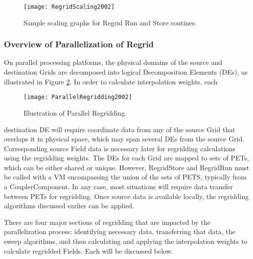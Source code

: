 \begin{center}
\begin{figure}
\caption{Sample scaling graphs for Regrid Run and Store routines. }
\label{fig:RegridScaling}
\resizebox{\textwidth}{!}
  {\texttt{[image: RegridScaling2002]}}
\end{figure}
\end{center}



\subsubsection{Overview of Parallelization of Regrid}
On parallel processing platforms, the physical domains of the source and
destination Grids are decomposed into logical Decomposition Elements (DEs), as
illustrated in Figure \ref{fig:ParallelRegridding}.  In order to calculate
interpolation weights, each

\begin{center}
\begin{figure}
\caption{Illustration of Parallel Regridding. }
\label{fig:ParallelRegridding}
\resizebox{\textwidth}{!}
  {\texttt{[image: ParallelRegridding2002]}}
\end{figure}
\end{center}

destination DE will require coordinate data from any of the source Grid that
overlaps it in physical space, which may span several DEs from the source Grid.
Corresponding source Field data is necessary later for regridding calculations
using the regridding weights.  The DEs for each Grid are mapped to sets of PETs,
which can be either shared or unique.  However, RegridStore and RegridRun must
be called with a VM encompassing the union of the sets of PETS, typically from
a CouplerComponent.  In any case, most situations will require data transfer
between PETs for regridding.  Once source data is available locally, the
regridding algorithms discussed earlier can be applied.

There are four major sections of regridding that are impacted by the
parallelization process: identifying necessary data, transferring that data, the
sweep algorithms, and then calculating and applying the interpolation weights to
calculate regridded Fields.  Each will be discussed below.


